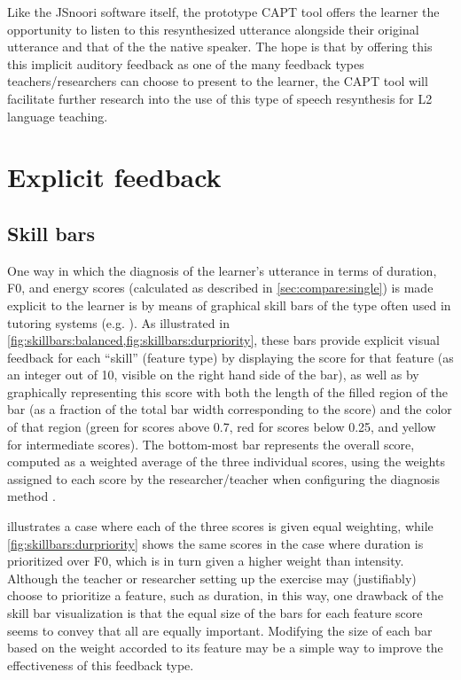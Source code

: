 			Like the JSnoori software itself, the prototype CAPT tool offers the learner the opportunity to listen to this resynthesized utterance alongside their original utterance and that of the the native speaker. The hope is that by offering this this implicit auditory feedback as one of the many feedback types teachers/researchers can choose to present to the learner, the CAPT tool will facilitate further research into the use of this type of speech resynthesis for L2 language teaching.
			
			
	\section{Explicit feedback}
	
		\subsection{Skill bars}
		
		
		One way in which 
		the diagnosis of the learner's utterance in terms of duration, F0, and energy scores (calculated as
		described in \cref{sec:compare:single}) is made explicit to the learner is by means of graphical skill bars of the type often used in tutoring systems (e.g. \cite{Long2011,Long2013}).
		As illustrated in \cref{fig:skillbars:balanced,fig:skillbars:durpriority}, these bars provide explicit visual feedback for each ``skill'' (feature type) by displaying the score for that feature (as an integer out of 10, visible on the right hand side of the bar), as well as by graphically representing this score with both the length of the filled region of the bar (as a fraction of the total bar width corresponding to the score) and the color of that region (green for scores above 0.7, red for scores below 0.25, and yellow for intermediate scores).
		 The bottom-most bar represents the overall score, computed as a weighted average of the three individual scores, using the weights assigned to each score by the researcher/teacher when configuring the diagnosis method .
		 
		   illustrates a case where each of the three scores is given equal weighting, while \cref{fig:skillbars:durpriority} shows the same scores in the case where duration is prioritized over F0, which is in turn given a higher weight than intensity.  Although the teacher or researcher setting up the exercise may (justifiably) choose to prioritize a feature, such as duration, in this way, one drawback of the skill bar visualization is that the equal size of the bars for each feature score seems to convey that all are equally important. Modifying the size of each bar based on the weight accorded to its feature may be a simple way to improve the effectiveness of this feedback type.%
		  

